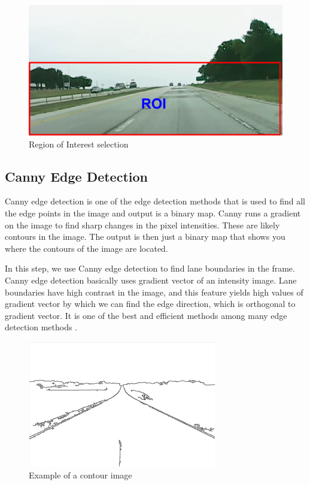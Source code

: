 \begin{figure}[H]
\begin{center}
    \includegraphics[scale=0.6]{img/lane3.png}
\end{center}
\caption{Region of Interest selection}
\label{fig:lane3}
\end{figure}

\subsection{Canny Edge Detection}

Canny edge detection is one of the edge detection methods that is used to find all the edge points in the image and output is a binary map. Canny runs a gradient on the image to find sharp changes in the pixel intensities. These are likely contours in the image. The output is then just a binary map that shows you where the contours of the image are located. 

In this step, we use Canny edge detection to find lane boundaries in the frame. Canny edge detection basically uses gradient vector of an intensity image. Lane boundaries have high contrast in the image, and this feature yields high values of gradient vector by which we can find the edge direction, which is orthogonal to gradient vector. It is one of the best and efficient methods among many edge detection methods \cite{lane3}.

\begin{figure}[H]
\begin{center}
    \includegraphics[scale=0.6]{img/lane4.png}
\end{center}
\caption{Example of a contour image}
\label{fig:lane4}
\end{figure}

